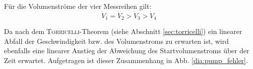 \begin{table}[h!]
	\renewcommand*{\arraystretch}{1.2}
	\centering
	\caption{Volumenströme der Zahnradpumpe in Abhängigkeit von der Zeit}
	\label{tab:pumpe2_anderung}
\end{table}%
\FloatBarrier

Für die Volumenströme der vier Messreihen gilt:
\begin{equation*}
	\dot{V}_1 = \dot{V}_2 > \dot{V}_3 > \dot{V}_4
\end{equation*}

Da nach dem \textsc{Torricelli}-Theorem (siehe Abschnitt \ref{sec:torricelli}) ein linearer Abfall der Geschwindigkeit bzw. des Volumenstroms zu erwarten ist, wird ebenfalls eine linearer Anstieg der Abweichung des Startvolumenstroms über der Zeit erwartet. Aufgetragen ist dieser Zusammenhang in Abb. \ref{dia:pump_fehler}.

